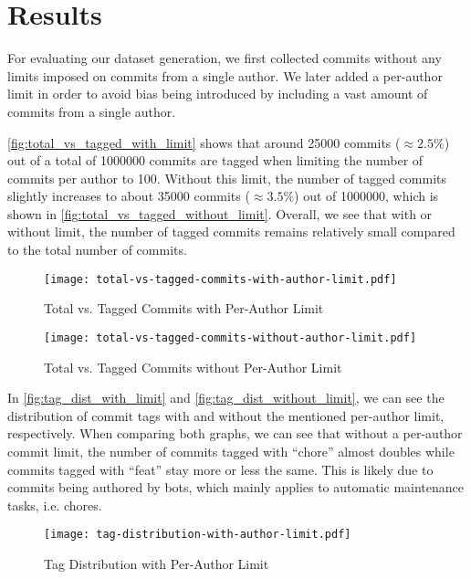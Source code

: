 \section{Results}
\label{sec:results}

For evaluating our dataset generation, we first collected commits without any limits imposed on commits from
a single author. We later added a per-author limit in order to avoid bias being introduced by including a
vast amount of commits from a single author.

\autoref{fig:total_vs_tagged_with_limit} shows that around 25000 commits ($\approx2.5\%$) out of a total of 1000000
commits are tagged when limiting the number of commits per author to 100. Without this limit, the number of
tagged commits slightly increases to about 35000 commits ($\approx3.5\%$) out of 1000000, which is shown in
\autoref{fig:total_vs_tagged_without_limit}. Overall, we see that with or without limit, the number of tagged
commits remains relatively small compared to the total number of commits.

\begin{figure}[H]
  \centering
  \texttt{[image: total-vs-tagged-commits-with-author-limit.pdf]}
  \caption{Total vs. Tagged Commits with Per-Author Limit}
  \label{fig:total_vs_tagged_with_limit}
\end{figure}

\begin{figure}[H]
  \centering
  \texttt{[image: total-vs-tagged-commits-without-author-limit.pdf]}
  \caption{Total vs. Tagged Commits without Per-Author Limit}
  \label{fig:total_vs_tagged_without_limit}
\end{figure}

In \autoref{fig:tag_dist_with_limit} and \autoref{fig:tag_dist_without_limit}, we can see the distribution
of commit tags with and without the mentioned per-author limit, respectively. When comparing both graphs,
we can see that without a per-author commit limit, the number of commits tagged with “chore” almost doubles
while commits tagged with “feat” stay more or less the same. This is likely due to commits being authored by
bots, which mainly applies to automatic maintenance tasks, i.e. chores.

\begin{figure}[H]
  \centering
  \texttt{[image: tag-distribution-with-author-limit.pdf]}
  \caption{Tag Distribution with Per-Author Limit}
  \label{fig:tag_dist_with_limit}
\end{figure}

